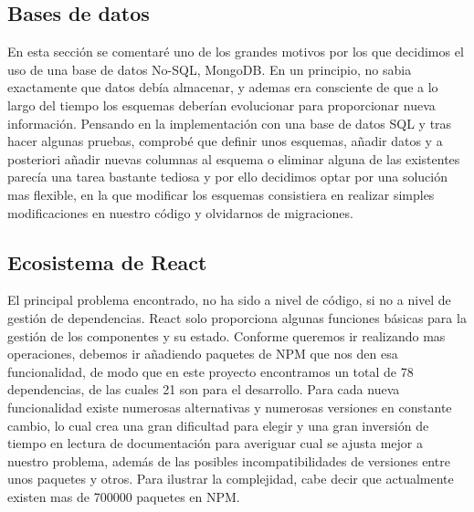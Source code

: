 \subsection {Bases de datos}
En esta sección se comentaré uno de los grandes motivos por los que decidimos el uso de una base de datos No-SQL, MongoDB. En un principio, no sabia exactamente que datos debía almacenar, y ademas era consciente de que a lo largo del tiempo los esquemas deberían evolucionar para proporcionar nueva información. Pensando en la implementación con una base de datos SQL y tras hacer algunas pruebas, comprobé que definir unos esquemas, añadir datos y a posteriori añadir nuevas columnas al esquema o eliminar alguna de las existentes parecía una tarea bastante tediosa y por ello decidimos optar por una solución mas flexible, en la que modificar los esquemas consistiera en realizar simples modificaciones en nuestro código y olvidarnos de migraciones.

\subsection {Ecosistema de React}
El principal problema encontrado, no ha sido a nivel de código, si no a nivel de gestión de dependencias. React solo proporciona algunas funciones básicas para la gestión de los componentes y su estado. Conforme queremos ir realizando mas operaciones, debemos ir añadiendo paquetes de NPM que nos den esa funcionalidad, de modo que en este proyecto encontramos un total de 78 dependencias, de las cuales 21 son para el desarrollo. Para cada nueva funcionalidad existe numerosas alternativas y numerosas versiones en constante cambio, lo cual crea una gran dificultad para elegir y una gran inversión de tiempo en lectura de documentación para averiguar cual se ajusta mejor a nuestro problema, además de las posibles incompatibilidades de versiones entre unos paquetes y otros. Para ilustrar la complejidad, cabe decir que actualmente existen mas de 700000 paquetes en NPM.




